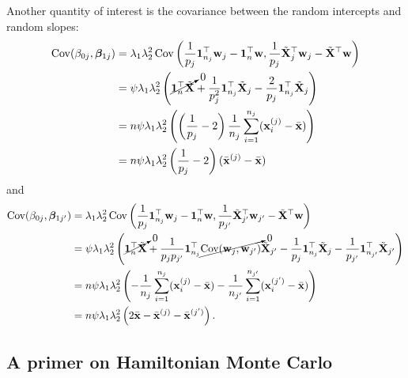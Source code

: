 Another quantity of interest is the covariance between the random intercepts and random slopes:
\begin{align*}
  \operatorname{Cov}(\beta_{0j}, \boldsymbol{\beta}_{1j}) 
  &= \lambda_1\lambda_2^2  \operatorname{Cov}\left( \frac{1}{p_{j}} {\mathbf 1}_{n_j}^\top {\mathbf w}_{j} - {\mathbf 1}_n^\top {\mathbf w}, \frac{1}{p_{j}} \tilde{{\mathbf X}}_{j}^\top {\mathbf w}_{j} - \tilde{{\mathbf X}}^\top {\mathbf w}   \right) \\
  &= \psi\lambda_1\lambda_2^2  \left( \cancelto{0}{{\mathbf 1}_{n}^\top \tilde{{\mathbf X}}} + \frac{1}{p_{j}^2} {\mathbf 1}_{n_j}^\top \tilde{{\mathbf X}}_j  - \frac{2}{p_{j}} {\mathbf 1}_{n_{j}}^\top \tilde{{\mathbf X}}_{j} \right) \\
  &= n\psi\lambda_1\lambda_2^2  \left(  \left(\frac{1}{p_j} - 2 \right) \frac{1}{n_{j}} \sum_{i=1}^{n_j}({\mathbf x}_i^{(j)} - \bar {{\mathbf x}})  \right) \\
  &= n\psi\lambda_1\lambda_2^2 \left(\frac{1}{p_j} - 2 \right) ( \bar{{\mathbf x}}^{(j)}   -\bar {{\mathbf x}}  ) 
\end{align*}
and
\begin{align*}
  \operatorname{Cov}(\beta_{0j}, \boldsymbol{\beta}_{1j'}) 
  &= \lambda_1\lambda_2^2  \operatorname{Cov}\left( \frac{1}{p_{j}} {\mathbf 1}_{n_j}^\top {\mathbf w}_{j} - {\mathbf 1}_n^\top {\mathbf w}, \frac{1}{p_{j'}} \tilde{{\mathbf X}}_{j'}^\top {\mathbf w}_{j'} - \tilde{{\mathbf X}}^\top {\mathbf w}   \right) \\
  &= \psi\lambda_1\lambda_2^2  \left( \cancelto{0}{{\mathbf 1}_{n}^\top \tilde{{\mathbf X}}} + \frac{1}{p_{j}p_{j'}} {\mathbf 1}_{n_j}^\top \cancelto{0}{\operatorname{Cov}({\mathbf w}_j,{\mathbf w}_{j'})} \tilde{{\mathbf X}}_{j'} - \frac{1}{p_{j}} {\mathbf 1}_{n_j}^\top \tilde{{\mathbf X}}_j  - \frac{1}{p_{j'}} {\mathbf 1}_{n_{j'}}^\top \tilde{{\mathbf X}}_{j'} \right) \\
  &= n\psi\lambda_1\lambda_2^2  \left(  - \frac{1}{n_{j}} \sum_{i=1}^{n_j}({\mathbf x}_i^{(j)} - \bar {{\mathbf x}})  - \frac{1}{n_{j'}} \sum_{i=1}^{n_{j'}}({\mathbf x}_i^{(j')} - \bar {{\mathbf x}}) \right) \\
  &= n\psi\lambda_1\lambda_2^2  \left(  2\bar {{\mathbf x}} -  \bar{{\mathbf x}}^{(j)}  -  \bar {{\mathbf x}}^{(j')}  \right).
\end{align*}

\subsection{A primer on Hamiltonian Monte Carlo}
\label{misc:hmc}

